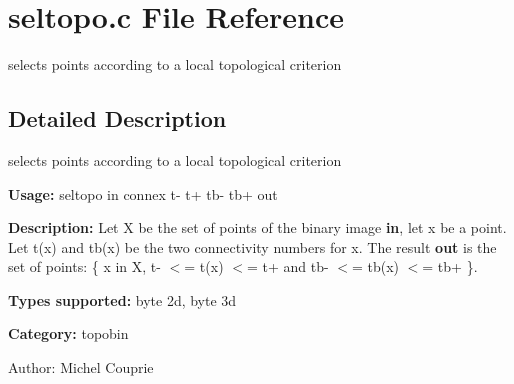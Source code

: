 \section{seltopo.c File Reference}
\label{seltopo_8c}
selects points according to a local topological criterion  




\label{_details}
\subsection{Detailed Description}
selects points according to a local topological criterion 

{\bf Usage:} seltopo in connex t- t+ tb- tb+ out

{\bf Description:} Let X be the set of points of the binary image {\bf in}, let x be a point. Let t(x) and tb(x) be the two connectivity numbers for x. The result {\bf out} is the set of points: \{ x in X, t- $<$= t(x) $<$= t+ and tb- $<$= tb(x) $<$= tb+ \}.

{\bf Types supported:} byte 2d, byte 3d

{\bf Category:} topobin

\begin{Desc}
\item[Author:]Michel Couprie \end{Desc}
